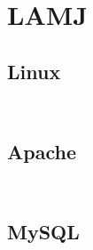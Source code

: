 \begin{lstlisting}[language=bash]

\end{lstlisting}

\chapter{LAMJ}



\section{Linux}



\begin{lstlisting}[language=bash]

\end{lstlisting}





\begin{lstlisting}[language=bash]

\end{lstlisting}

\section{Apache}


\begin{lstlisting}[language=bash]

\end{lstlisting}




\begin{lstlisting}[language=bash]

\end{lstlisting}


\section{MySQL}


\begin{lstlisting}[language=bash]

\end{lstlisting}




\begin{lstlisting}[language=bash]

\end{lstlisting}


